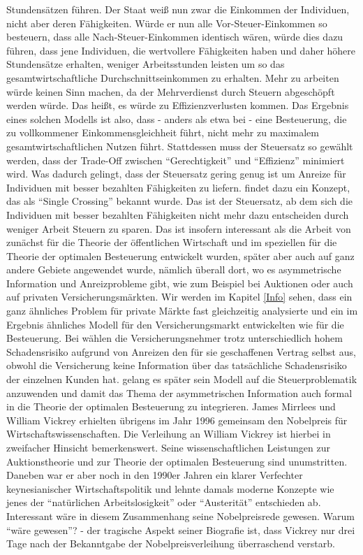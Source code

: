 Stundensätzen führen. Der Staat weiß nun zwar die Einkommen der Individuen, nicht aber deren Fähigkeiten. Würde er nun alle Vor-Steuer-Einkommen so besteuern, dass alle Nach-Steuer-Einkommen identisch wären, würde dies dazu führen, dass jene Individuen, die wertvollere Fähigkeiten haben und daher höhere Stundensätze erhalten, weniger Arbeitsstunden leisten um so das gesamtwirtschaftliche Durchschnittseinkommen zu erhalten. Mehr zu arbeiten würde keinen Sinn machen, da der Mehrverdienst durch Steuern abgeschöpft werden würde. Das heißt, es würde zu Effizienzverlusten kommen. Das Ergebnis eines solchen Modells ist also, dass - anders als etwa bei \Textcite{Pigou1920} - eine Besteuerung, die zu vollkommener Einkommensgleichheit führt, nicht mehr zu maximalem gesamtwirtschaftlichen Nutzen führt. Stattdessen muss der Steuersatz so gewählt werden, dass der Trade-Off zwischen "`Gerechtigkeit"' und "`Effizienz"' minimiert wird. Was dadurch gelingt, dass der Steuersatz gering genug ist um Anreize für Individuen mit besser bezahlten Fähigkeiten zu liefern. \textcite{Mirrlees1971} findet dazu ein Konzept, das als "`Single Crossing"' bekannt wurde. Das ist der Steuersatz, ab dem sich die Individuen mit besser bezahlten Fähigkeiten nicht mehr dazu entscheiden durch weniger Arbeit Steuern zu sparen. Das ist insofern interessant als die Arbeit von \textcite{Mirrlees1971} zunächst für die Theorie der öffentlichen Wirtschaft und im speziellen für die Theorie der optimalen Besteuerung entwickelt wurden, später aber auch auf ganz andere Gebiete angewendet wurde, nämlich überall dort, wo es asymmetrische Information und Anreizprobleme gibt, wie zum Beispiel bei Auktionen oder auch auf privaten Versicherungsmärkten. Wir werden im Kapitel \ref{Info} sehen, dass \textcite{Akerlof1970} ein ganz ähnliches Problem für private Märkte fast gleichzeitig analysierte und \textcite{Stiglitz1976a} ein im Ergebnis ähnliches Modell für den Versicherungsmarkt entwickelten wie \textcite{Mirrlees1971} für die Besteuerung. Bei \textcite{Stiglitz1976a} wählen die Versicherungsnehmer trotz unterschiedlich hohem Schadensrisiko aufgrund von Anreizen den für sie geschaffenen Vertrag selbst aus, obwohl die Versicherung keine Information über das tatsächliche Schadensrisiko der einzelnen Kunden hat. \textcite{Stiglitz1982} gelang es später sein Modell auf die Steuerproblematik anzuwenden und damit das Thema der asymmetrischen Information auch formal in die Theorie der optimalen Besteuerung zu integrieren. James Mirrlees und William Vickrey erhielten übrigens im Jahr 1996 gemeinsam den Nobelpreis für Wirtschaftswissenschaften. Die Verleihung an William Vickrey ist hierbei in zweifacher Hinsicht bemerkenswert. Seine wissenschaftlichen Leistungen zur Auktionstheorie und zur Theorie der optimalen Besteuerung sind unumstritten. Daneben war er aber noch in den 1990er Jahren ein klarer Verfechter keynesianischer Wirtschaftspolitik und lehnte damals moderne Konzepte wie jenes der "`natürlichen Arbeitslosigkeit"' oder "`Austerität"' entschieden ab. Interessant wäre in diesem Zusammenhang seine Nobelpreisrede gewesen. Warum "`wäre gewesen"'? - der tragische Aspekt seiner Biografie ist, dass Vickrey nur drei Tage nach der Bekanntgabe der Nobelpreisverleihung überraschend verstarb.

